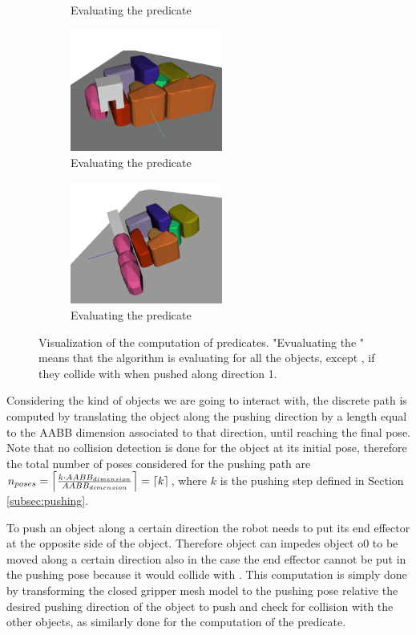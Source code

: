 \begin{figure}[h]
\begin{subfigure}[t]{5cm}
\caption{Evaluating the  predicate}\label{fig:block_dir_original}
\end{subfigure}
\begin{subfigure}[t]{5cm}
\centering
\includegraphics[width=5cm]{Img/block_dir/pushing44.png}
\caption{Evaluating the  predicate}\label{fig:block_dir_original}
\end{subfigure}
\begin{subfigure}[t]{5cm}
\centering
\includegraphics[width=5cm]{Img/block_dir/pushing55.png}
\caption{Evaluating the  predicate}\label{fig:block_dir_original}
\end{subfigure}
\caption{Visualization of the computation of  predicates. "Evualuating the " means that the algorithm is evaluating for all the objects, except , if they collide with  when pushed along direction 1.}\label{fig:block_dir}
\end{figure}

Considering the kind of objects we are going to interact with, the discrete path  is computed by translating the object along the pushing direction by a length equal to the AABB dimension associated to that direction, until reaching the final pose. Note that no collision detection is done for the object at its initial pose, therefore the total number of poses considered for the pushing path are $n_{poses} = \ceil*{\frac{k \cdot AABB_{dimension}}{AABB_{dimension}}} = \ceil*{k}$, where $k$ is the pushing step defined in Section \ref{subsec:pushing}.

To push an object along a certain direction the robot needs to put its end effector at the opposite side of the object. Therefore object  can impedes object {o0} to be moved along a certain direction also in the case the end effector cannot be put in the pushing pose because it would collide with . This computation is simply done by transforming the closed gripper mesh model to the pushing pose relative the desired pushing direction of the object to push and check for collision with the other objects, as similarly done for the computation of the  predicate.

